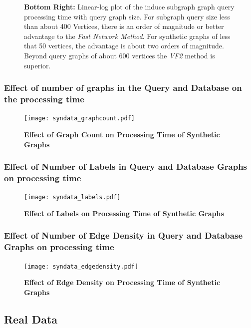 \begin{figure}[H]
{\textbf{Bottom Right:} Linear-log plot of the induce subgraph graph query processing time with query graph size. For subgraph query size less than about 400 Vertices, there is an order of magnitude or better advantage to the \textit{Fast Network Method}. For synthetic graphs of less that 50 vertices, the advantage is about two orders of magnitude. Beyond query graphs of about 600 vertices the \textit{VF2} method is superior.
}
\label{fig:fig91}
\end{figure}




\subsubsection{Effect of number of graphs in the Query and Database on the processing time}

\begin{figure}[H]
\centering
\texttt{[image: syndata\_graphcount.pdf]}
\caption{\textbf{Effect of Graph Count on Processing Time of Synthetic Graphs}} 
\label{fig:graphcount}
\end{figure}



\subsubsection{Effect of Number of Labels in Query and Database Graphs on processing time}

\begin{figure}[H]
\centering
\texttt{[image: syndata\_labels.pdf]}
\caption{\textbf{Effect of Labels on Processing Time of Synthetic Graphs}}
\label{fig:labels}
\end{figure}


\subsubsection{Effect of Number of Edge Density in Query and Database Graphs on processing time}

\begin{figure}[H]
\centering
\texttt{[image: syndata\_edgedensity.pdf]}
\caption{\textbf{Effect of Edge Density on Processing Time of Synthetic Graphs}} 
\label{fig:edgedensity}
\end{figure}





\subsection{Real Data}

